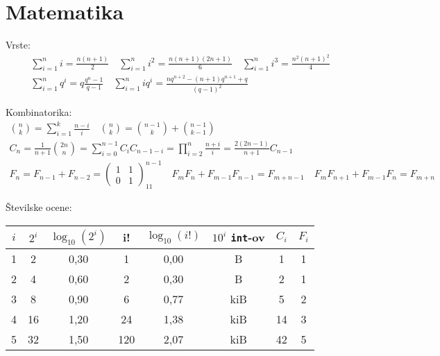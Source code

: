\documentclass[a4paper,oneside,12pt]{article}
\newenvironment{description*}%
{
\begin{description}
\setlength{\itemsep}{0pt}
\setlength{\parskip}{2pt}
}
{\end{description}}
\begin{document}
\section{Matematika}
\small
\begin{description*}
  \item[Vrste:] \vspace{-1ex}
    \begin{gather*}
      \sum_{i=1}^n i = \frac{n(n+1)}{2} \quad \sum_{i=1}^n i^2 = \frac{n(n+1)(2n+1)}{6} \quad
      \sum_{i=1}^n i^3 = \frac{n^2(n+1)^2}{4} \\
      \sum_{i=1}^n q^i = q \frac{q^n - 1}{q - 1} \quad \sum_{i=1}^n i q^i = \frac{n
        q^{n+2} - (n+1)q^{n+1} + q}{(q-1)^2}
    \end{gather*}
  \item[Kombinatorika:]
    \begin{gather*}
      \binom{n}{k} = \sum_{i=1}^k \frac{n-i}{i} \quad \binom{n}{k} = \binom{n-1}{k} + \binom{n-1}{k-1} \\
      C_n = \frac{1}{n+1}\binom{2n}{n} = \sum_{i=0}^{n-1}C_iC_{n-1-i} = \prod_{i=2}^n\frac{n+i}{i} = \frac{2(2n-1)}{n+1}C_{n-1} \\
      F_n = F_{n-1} + F_{n-2} = \begin{pmatrix} 1 & 1 \\ 0 & 1
      \end{pmatrix}^{n-1}_{11}\quad F_mF_n + F_{m-1}F_{n-1}  = F_{m+n-1} \quad
      F_mF_{n+1} + F_{m-1}F_n = F_{m+n}
    \end{gather*}
  \item[Številske ocene:] \mbox{} \\[12pt]
    \hspace*{-20pt}
    \begin{tabular}[h]{|c|c|c|c|c|c|c|c|} \hline
      $i$ & $2^i$ & $\log_{10}(2^i)$ & i! & $\log_{10}(i!)$ & $10^i$ \texttt{int}-ov & $C_i$ & $F_i$ \\ \hline
        1 &             2 & 0,30 & 1        &  0,00 & \unit[40]{B}    & 1       & 1 \\
        2 &             4 & 0,60 & 2        &  0,30 & \unit[400]{B}   & 2       & 1 \\
        3 &             8 & 0,90 & 6        &  0,77 & \unit[3,9]{kiB} & 5       & 2 \\
        4 &            16 & 1,20 & 24       &  1,38 & \unit[39]{kiB}  & 14      & 3 \\
        5 &            32 & 1,50 & 120      &  2,07 & \unit[400]{kiB} & 42      & 5 \\

\end{tabular}
\end{description*}
\end{document}
